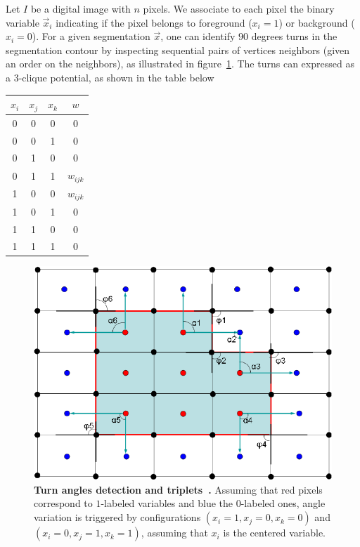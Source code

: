 Let $I$ be a digital image with $n$ pixels. We associate to each pixel the binary variable $\vec{x}_i$ indicating if the pixel belongs to foreground ($x_i=1$) or background ($x_i=0$). For a given segmentation $\vec{x}$, one can identify $90$ degrees turns in the segmentation contour by inspecting sequential pairs of vertices neighbors (given an order on the neighbors), as illustrated in figure~\cref{ch3:fig:elzehiry-turn-angles}. The turns can expressed as a $3$-clique potential, as shown in the table below

\begin{center}
\begin{tabular}{|c|c|c|c|}
\hline
$x_i$ & $x_j$ & $x_k$ & $w$ \\
\hline 
0 & 0 & 0 & 0 \\
0 & 0 & 1 & 0 \\
0 & 1 & 0 & 0 \\
0 & 1 & 1 & $w_{ijk}$ \\
1 & 0 & 0 & $w_{ijk}$ \\
1 & 0 & 1 & 0 \\
1 & 1 & 0 & 0 \\
1 & 1 & 1 & 0 \\
\hline 
\end{tabular}
\end{center}

\begin{figure}
\center
\includegraphics[scale=0.25]{figures/chapter3/elzehiry/turn-angles.png}
\caption{\textbf{Turn angles detection and triplets~\cite{zehiry10fast}.} Assuming that red pixels correspond to $1$-labeled variables and blue the $0$-labeled ones, angle variation is triggered by configurations $(x_i=1,x_j=0,x_k=0)$ and $(x_i=0,x_j=1,x_k=1)$, assuming that $x_i$ is the centered variable. }
\label{ch3:fig:elzehiry-turn-angles}
\end{figure}

